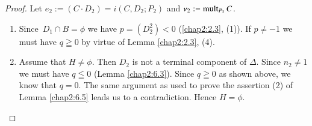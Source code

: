 \begin{proof}
Let $e_{2}:=(C\cdot D_{2})=i(C,D_{2};P_{2})$ and
$\nu_{2}:=\operatorname{mult}_{P_{2}}C$. 
\begin{enumerate}
\renewcommand{\labelenumi}{\rm(\theenumi)}
\item Since\pageoriginale\ $D_{1}\cap B=\phi$ we have $p=(D^{2}_{2})<0$
  (\cf \ref{chap2:2.3}, (1)). If $p\neq -1$ we must have $q\geqq 0$ by
  virtue of Lemma \ref{chap2:2.3}, (4).

\item Assume that $H\neq \phi$. Then $D_{2}$ is not a terminal
  component of $\Delta$. Since $n_{2}\neq 1$ we must have $q\leqq 0$
  (\cf Lemma \ref{chap2:6.3}). Since $q\geqq 0$ as shown above, we know
  that $q=0$. The same argument as used to prove the assertion (2) of
  Lemma \ref{chap2:6.5} leads us to a contradiction. Hence $H=\phi$.


\end{enumerate}
\end{proof}

